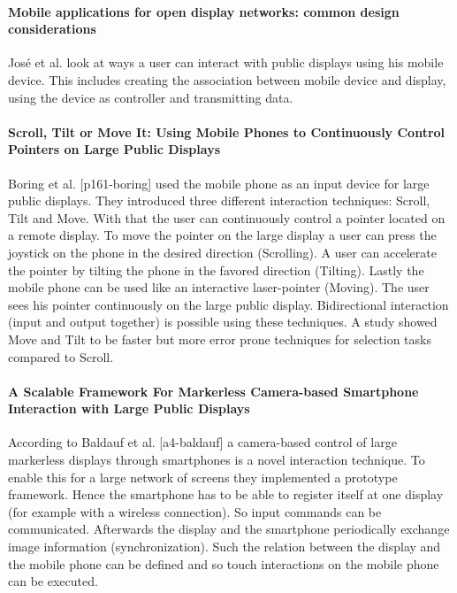 \paragraph{Mobile applications for open display networks: common design considerations}
José et al. \cite{jose_mobile_2013} look at ways a user can interact with public displays using his mobile device.
This includes creating the association between mobile device and display, using the device as controller and transmitting data.

\paragraph{Scroll, Tilt or Move It: Using Mobile Phones to Continuously Control Pointers on Large Public Displays}
Boring et al. [p161-boring] used the mobile phone as an input device for large public displays. They introduced three different interaction techniques: Scroll, Tilt and Move. With that the user can continuously control a pointer located on a remote display. To move the pointer on the large display a user can press the joystick on the phone in the desired direction (Scrolling). 
A user can accelerate the pointer by tilting the phone in the favored direction (Tilting). Lastly the mobile phone can be used like an interactive laser-pointer (Moving). The user sees his pointer continuously on the large public display. Bidirectional interaction (input and output together) is possible using these techniques. A study showed Move and Tilt to be faster but more error prone techniques for selection tasks compared to Scroll. 

\paragraph{A Scalable Framework For Markerless Camera-based Smartphone Interaction with Large Public Displays}
According to Baldauf et al. [a4-baldauf] a camera-based control of large markerless displays through smartphones is a novel interaction technique. To enable this for a large network of screens they implemented a prototype framework. Hence the smartphone has to be able to register itself at one display (for example with a wireless connection). So input commands can be communicated. Afterwards the display and the smartphone periodically exchange image information (synchronization). Such the relation between the display and the mobile phone can be defined and so touch interactions on the mobile phone can be executed.

